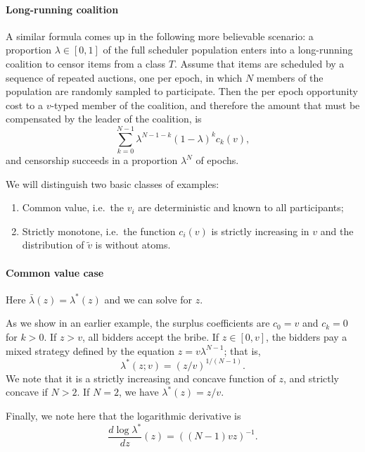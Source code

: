 \paragraph{Long-running coalition}
%
A similar formula comes up in the following more believable scenario: a proportion $\lambda\in[0,1]$ of the full scheduler population enters into a long-running coalition to censor items from a class $T$.
%
Assume that items are scheduled by a sequence of repeated auctions, one per epoch, in which $N$ members of the population are randomly sampled to participate.
%
Then the per epoch opportunity cost to a $v$-typed member of the coalition, and therefore the amount that must be compensated by the leader of the coalition, is
\[
  \sum_{k=0}^{N-1}\lambda^{N-1-k}(1-\lambda)^k c_k(v),
\]
%
and censorship succeeds in a proportion $\lambda^N$ of epochs.




We will distinguish two basic classes of examples:
\begin{enumerate}
  \item Common value, i.e.~the $v_i$ are deterministic and known to all participants;
  \item Strictly monotone, i.e.~the function $c_i(v)$ is strictly increasing in $v$ and the distribution of $\tilde{v}$ is without atoms.
\end{enumerate}

\paragraph{Common value case}
Here $\bar\lambda(z)=\lambda^*(z)$ and we can solve for $z$.


\begin{example}

  As we show in an earlier example, the surplus coefficients are $c_0 = v$ and $c_k=0$ for $k>0$.
  If $z>v$, all bidders accept the bribe.
  If $z\in[0,v]$, the bidders pay a mixed strategy defined by the equation $z=v\lambda^{N-1}$; that is,
  \[
    \lambda^*(z; v) = (z/v)^{1/(N-1)}.
  \] 
  We note that it is a strictly increasing and concave function of $z$, and strictly concave if $N>2$.
  If $N=2$, we have $\lambda^*(z)=z/v$.
  
  Finally, we note here that the logarithmic derivative is 
  \[
    \frac{d\log \lambda^*}{dz}(z)= ((N-1)vz)^{-1}.
  \]

\end{example}


